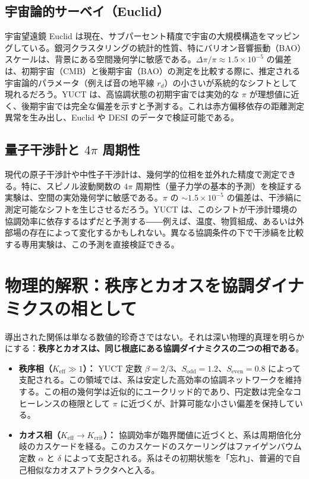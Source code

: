 \documentclass[11pt,a4paper]{article}
\begin{document}
	\subsection{宇宙論的サーベイ（Euclid）}
	
	宇宙望遠鏡 Euclid は現在、サブパーセント精度で宇宙の大規模構造をマッピングしている。銀河クラスタリングの統計的性質、特にバリオン音響振動（BAO）スケールは、背景にある空間幾何学に敏感である。\(\Delta\pi/\pi \approx 1.5\times10^{-5}\) の偏差は、初期宇宙（CMB）と後期宇宙（BAO）の測定を比較する際に、推定される宇宙論的パラメータ（例えば音の地平線 \(r_d\)）の小さいが系統的なシフトとして現れるだろう。YUCT は、高協調状態の初期宇宙では実効的な \(\pi\) が理想値に近く、後期宇宙では完全な偏差を示すと予測する。これは赤方偏移依存の距離測定異常を生み出し、Euclid や DESI のデータで検証可能である。
	
	\subsection{量子干渉計と \(4\pi\) 周期性}
	
	現代の原子干渉計や中性子干渉計は、幾何学的位相を並外れた精度で測定できる。特に、スピノル波動関数の \(4\pi\) 周期性（量子力学の基本的予測）を検証する実験は、空間の実効幾何学に敏感である。\(\pi\) の \(\sim 1.5\times10^{-5}\) の偏差は、干渉縞に測定可能なシフトを生じさせるだろう。YUCT は、このシフトが干渉計環境の協調効率に依存するはずだと予測する――例えば、温度、物質組成、あるいは外部場の存在によって変化するかもしれない。異なる協調条件の下で干渉縞を比較する専用実験は、この予測を直接検証できる。
	
	\section{物理的解釈：秩序とカオスを協調ダイナミクスの相として}
	
	導出された関係は単なる数値的珍奇さではない。それは深い物理的真理を明らかにする：\textbf{秩序とカオスは、同じ根底にある協調ダイナミクスの二つの相である}。
	
	\begin{itemize}
		\item \textbf{秩序相（\(K_{\mathrm{eff}} \gg 1\)）：} YUCT 定数 \(\beta = 2/3\)、\(S_{\mathrm{odd}} = 1.2\)、\(S_{\mathrm{even}} = 0.8\) によって支配される。この領域では、系は安定した高効率の協調ネットワークを維持する。この相の幾何学は近似的にユークリッド的であり、円定数は完全なコヒーレンスの極限として \(\pi\) に近づくが、計算可能な小さい偏差を保持している。
		
		\item \textbf{カオス相（\(K_{\mathrm{eff}} \to K_{\mathrm{crit}}\)）：} 協調効率が臨界閾値に近づくと、系は周期倍化分岐のカスケードを経る。このカスケードのスケーリングはファイゲンバウム定数 \(\alpha\) と \(\delta\) によって支配される。系はその初期状態を「忘れ」、普遍的で自己相似なカオスアトラクタへと入る。
	\end{itemize}
	
\end{document}
